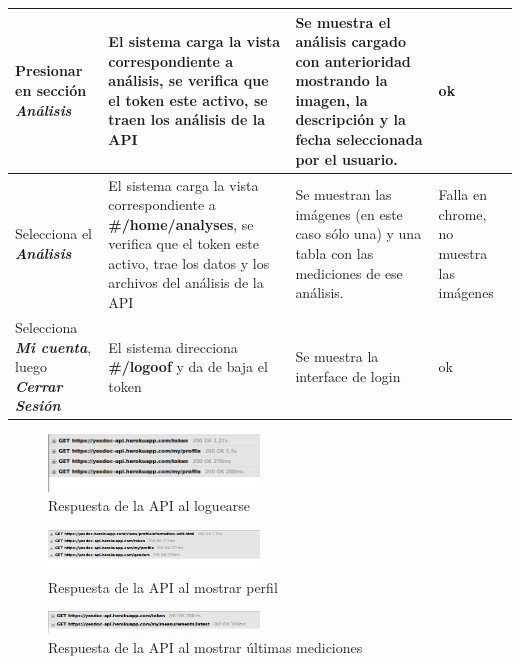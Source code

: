 \begin{longtable}{|p{4cm}|p{4cm}|p{4cm}|p{3cm}|}
Presionar en sección \textit{\textbf{Análisis }} 
& El sistema carga la vista correspondiente a análisis, se verifica que el token este activo, se traen los análisis de la API
& Se muestra el análisis cargado con anterioridad mostrando la imagen, la descripción y la fecha seleccionada por el usuario.
& ok
\\ \hline






Selecciona el \textit{\textbf{Análisis}}
& El sistema carga la vista correspondiente a \textbf{ \#/home/analyses}, se verifica que el token este activo, trae los datos y los archivos del análisis de la API
& Se muestran las imágenes (en este caso sólo una) y una tabla con las mediciones de ese análisis.
& Falla en chrome, no muestra las imágenes
\\ \hline




Selecciona \textit{\textbf{Mi cuenta}}, luego \textit{\textbf{Cerrar Sesión}}
& El sistema direcciona \textbf{\#/logoof } y da de baja el token
& Se muestra la interface de login
& ok
\\ \hline


\end{longtable}







    \begin{figure}[h]
        \centering
        \includegraphics[width=0.5\textwidth]{img/5-login}
        \caption{Respuesta de la API al loguearse}
		\label{5-login}
    \end{figure}
    
        \begin{figure}[h]
        \centering
        \includegraphics[width=0.5\textwidth]{img/5-perfil}
        \caption{Respuesta de la API al mostrar perfil}
		\label{5-perfil}
    \end{figure}
    
        \begin{figure}[h]
        \centering
        \includegraphics[width=0.5\textwidth]{img/5-resumen}
        \caption{Respuesta de la API al mostrar últimas mediciones}
		\label{5-resumen}
    \end{figure}
    
